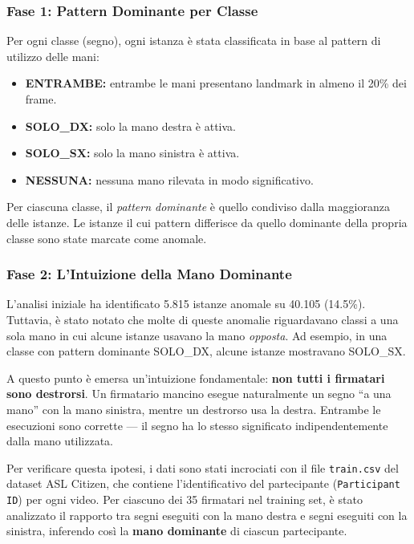 \subsubsection{Fase 1: Pattern Dominante per Classe}

Per ogni classe (segno), ogni istanza è stata classificata in base al pattern di utilizzo delle mani:

\begin{itemize}
    \item \textbf{ENTRAMBE:} entrambe le mani presentano landmark in almeno il 20\% dei frame.
    \item \textbf{SOLO\_DX:} solo la mano destra è attiva.
    \item \textbf{SOLO\_SX:} solo la mano sinistra è attiva.
    \item \textbf{NESSUNA:} nessuna mano rilevata in modo significativo.
\end{itemize}

Per ciascuna classe, il \textit{pattern dominante} è quello condiviso dalla maggioranza delle istanze. Le istanze il cui pattern differisce da quello dominante della propria classe sono state marcate come anomale.

\subsubsection{Fase 2: L'Intuizione della Mano Dominante}

L'analisi iniziale ha identificato 5.815 istanze anomale su 40.105 (14.5\%). Tuttavia, è stato notato che molte di queste anomalie riguardavano classi a una sola mano in cui alcune istanze usavano la mano \textit{opposta}. Ad esempio, in una classe con pattern dominante SOLO\_DX, alcune istanze mostravano SOLO\_SX.

A questo punto è emersa un'intuizione fondamentale: \textbf{non tutti i firmatari sono destrorsi}. Un firmatario mancino esegue naturalmente un segno ``a una mano'' con la mano sinistra, mentre un destrorso usa la destra. Entrambe le esecuzioni sono corrette --- il segno ha lo stesso significato indipendentemente dalla mano utilizzata.

Per verificare questa ipotesi, i dati sono stati incrociati con il file \texttt{train.csv} del dataset ASL Citizen, che contiene l'identificativo del partecipante (\texttt{Participant ID}) per ogni video. Per ciascuno dei 35 firmatari nel training set, è stato analizzato il rapporto tra segni eseguiti con la mano destra e segni eseguiti con la sinistra, inferendo così la \textbf{mano dominante} di ciascun partecipante.


